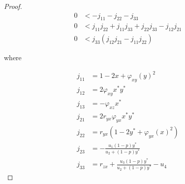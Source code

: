 \begin{proof}
    \begin{align*}
        0 &< -j_{11}-j_{22}-j_{33}\\
        0 &< j_{11}j_{22}+j_{11}j_{33}+j_{22}j_{33}-j_{12}j_{21}\\
        0 &< j_{33}\left(j_{12}j_{21}-j_{11}j_{22}\right)
    \end{align*}

    where
    
    \begin{align*}
        j_{11} &= 1-2x+\varphi_{xy}\left(y\right)^2\\
        j_{12} &= 2\varphi_{xy}x^*y^*\\
        j_{13} &= -\varphi_{xz}x^*\\
        j_{21} &= 2r_{yx}\varphi_{yx}x^*y^*\\
        j_{22} &= r_{yx}\left(1-2y^*+\varphi_{yx}\left(x\right)^2\right)\\
        j_{23} &= -\frac{u_1\left(1-p\right)y^*}{u_2+\left(1-p\right)y^*}\\
        j_{33} &= r_{zx}+\frac{u_3\left(1-p\right)y^*}{u_2+\left(1-p\right)y^*}-u_4
    \end{align*}
\end{proof}

